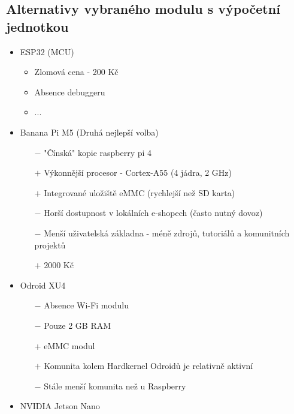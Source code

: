 \subsection{Alternativy vybraného modulu s výpočetní jednotkou}


\begin{itemize}
    \item ESP32 (MCU)
        \begin{itemize}
            \item Zlomová cena - 200 Kč
            \item Absence debuggeru
            \item ...
        \end{itemize}
    \item Banana Pi M5 (Druhá nejlepší volba)
        \begin{itemize}
            \item[$-$] "Čínská" kopie raspberry pi 4
            \item[$+$] Výkonnější procesor - Cortex-A55 (4 jádra, 2 GHz)
            \item[$+$] Integrované uložiště eMMC (rychlejší než SD karta)
            \item[$-$] Horší dostupnost v lokálních e-shopech (často nutný dovoz)
            \item[$-$] Menší uživatelská základna - méně zdrojů, tutoriálů a komunitních projektů
            \item[$+$] 2000 Kč
        \end{itemize}
    \item Odroid XU4
        \begin{itemize}
            \item[$-$] Absence Wi-Fi modulu
            \item[$-$] Pouze 2 GB RAM
            \item[+] eMMC modul
            \item[$+$] Komunita kolem Hardkernel Odroidů je relativně aktivní
            \item[$-$] Stále menší komunita než u Raspberry
        \end{itemize}
    \item NVIDIA Jetson Nano 
        \begin{itemize}

\end{itemize}
\end{itemize}
